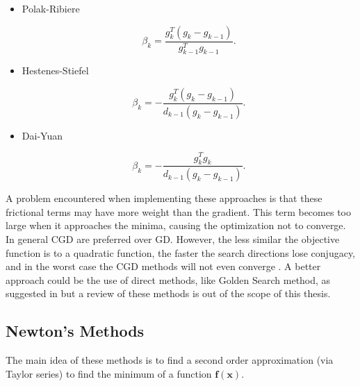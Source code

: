 \begin{itemize}
	\item Polak-Ribiere
	
	\begin{equation}
	\beta_k = \frac{ g_k^{T} (g_k - g_{k-1})}{ g_{k-1}^{T} g_{k-1}}	.
	\end{equation}
	
	\item Hestenes-Stiefel
	
	\begin{equation}
	\beta_k = - \frac{ g_k^{T} (g_k - g_{k-1})}{d_{k-1} (g_k - g_{k-1})}	.
	\end{equation}	
	
	\item Dai-Yuan
	
	\begin{equation}
	\beta_k =- \frac{ g_k^{T} g_k }{d_{k-1} (g_k - g_{k-1})}		.
	\end{equation}
	
	
\end{itemize}






A problem encountered when implementing these approaches is that these frictional terms may have more weight than the gradient. This term becomes too large when it approaches the minima, causing the optimization not to converge. In general  CGD are preferred over  GD. However, the less similar the objective function is to a quadratic function, the faster the search directions lose conjugacy, and in the worst case the CGD methods will not even converge \cite{trond}. A better approach could be the use of direct methods, like Golden Search method, as suggested in \cite{CGD_converge} but a review of these methods is out of the scope of this thesis.











\subsection{Newton's Methods}
\label{subsec:newton}



The main idea of these methods is to find a second order approximation (via Taylor series) to find the minimum of a function $\mathbf{f(x)}$.


